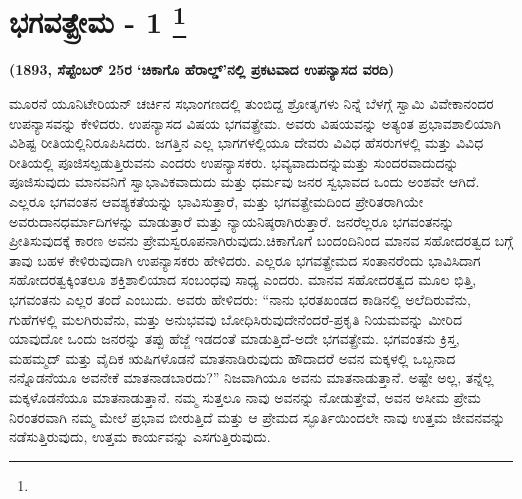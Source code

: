 
\vspace{-0.6cm}

\chapter[ಭಗವತ್ಪ್ರೇಮ - ೧ ]{ಭಗವತ್ಪ್ರೇಮ - 1 \protect\footnote{}}

\vskip 6pt

\vskip 6pt

\centerline{\textbf{(1893, ಸೆಪ್ಟೆಂಬರ್​ 25ರ ‘ಚಿಕಾಗೊ ಹೆರಾಲ್ಡ್​’ನಲ್ಲಿ ಪ್ರಕಟವಾದ ಉಪನ್ಯಾಸದ ವರದಿ)}}

\vskip 6pt

\vskip 6pt

ಮೂರನೆ ಯೂನಿಟೇರಿಯನ್​ ಚರ್ಚಿನ ಸಭಾಂಗಣದಲ್ಲಿ ತುಂಬಿದ್ದ ಶ್ರೋತೃಗಳು ನಿನ್ನೆ ಬೆಳಗ್ಗೆ ಸ್ವಾಮಿ ವಿವೇಕಾನಂದರ ಉಪನ್ಯಾಸವನ್ನು ಕೇಳಿದರು. ಉಪನ್ಯಾಸದ ವಿಷಯ ಭಗವತ್ಪ್ರೇಮ. ಅವರು ವಿಷಯವನ್ನು ಅತ್ಯಂತ ಪ್ರಭಾವಶಾಲಿಯಾಗಿ ವಿಶಿಷ್ಟ ರೀತಿಯಲ್ಲಿ\break ನಿರೂಪಿಸಿದರು. ಜಗತ್ತಿನ ಎಲ್ಲ ಭಾಗಗಳಲ್ಲಿಯೂ ದೇವರು ವಿವಿಧ ಹೆಸರುಗಳಲ್ಲಿ ಮತ್ತು ವಿವಿಧ ರೀತಿಯಲ್ಲಿ ಪೂಜಿಸಲ್ಪಡುತ್ತಿರುವನು ಎಂದರು ಉಪನ್ಯಾಸಕರು. ಭವ್ಯವಾದುದನ್ನು\break ಮತ್ತು ಸುಂದರವಾದುದನ್ನು ಪೂಜಿಸುವುದು ಮಾನವನಿಗೆ ಸ್ವಾಭಾವಿಕವಾದುದು ಮತ್ತು ಧರ್ಮವು ಜನರ ಸ್ವಭಾವದ ಒಂದು ಅಂಶವೇ ಆಗಿದೆ. ಎಲ್ಲರೂ ಭಗವಂತನ ಆವಶ್ಯ\-ಕತೆಯನ್ನು ಭಾವಿಸುತ್ತಾರೆ, ಮತ್ತು ಭಗವತ್ಪ್ರೇಮದಿಂದ ಪ್ರೇರಿತರಾಗಿಯೇ ಅವರು\break ದಾನಧರ್ಮಾದಿಗಳನ್ನು ಮಾಡುತ್ತಾರೆ ಮತ್ತು ನ್ಯಾಯನಿಷ್ಠರಾಗಿರುತ್ತಾರೆ. ಜನರೆಲ್ಲರೂ ಭಗವಂತನನ್ನು ಪ್ರೀತಿಸುವುದಕ್ಕೆ ಕಾರಣ ಅವನು ಪ್ರೇಮಸ್ವರೂಪನಾಗಿರುವುದು.\break ಚಿಕಾಗೊಗೆ ಬಂದಂದಿನಿಂದ ಮಾನವ ಸಹೋದರತ್ವದ ಬಗ್ಗೆ ತಾವು ಬಹಳ ಕೇಳಿರುವುದಾಗಿ ಉಪನ್ಯಾಸಕರು ಹೇಳಿದರು. ಎಲ್ಲರೂ ಭಗವತ್ಪ್ರೇಮದ ಸಂತಾನರೆಂದು ಭಾವಿಸಿದಾಗ ಸಹೋದರತ್ವಕ್ಕಿಂತಲೂ ಶಕ್ತಿಶಾಲಿಯಾದ ಸಂಬಂಧವು ಸಾಧ್ಯ ಎಂದರು. ಮಾನವ ಸಹೋದರತ್ವದ ಮೂಲ ಭಿತ್ತಿ, ಭಗವಂತನು ಎಲ್ಲರ ತಂದೆ ಎಂಬುದು. ಅವರು ಹೇಳಿದರು: “ನಾನು ಭರತಖಂಡದ ಕಾಡಿನಲ್ಲಿ ಅಲೆದಿರುವೆನು, ಗುಹೆಗಳಲ್ಲಿ ಮಲಗಿರುವೆನು, ಮತ್ತು ಅನುಭವವು ಬೋಧಿಸಿರುವುದೇನೆಂದರೆ-ಪ್ರಕೃತಿ ನಿಯಮವನ್ನು ಮೀರಿದ ಯಾವುದೋ ಒಂದು ಜನರನ್ನು ತಪ್ಪು ಹೆಜ್ಜೆ ಇಡದಂತೆ ಮಾಡುತ್ತಿದೆ-ಅದೇ ಭಗವತ್ಪ್ರೇಮ. ಭಗವಂತನು ಕ್ರಿಸ್ತ, ಮಹಮ್ಮದ್​ ಮತ್ತು ವೈದಿಕ ಋಷಿಗಳೊಡನೆ ಮಾತನಾಡಿರುವುದು ಹೌದಾದರೆ ಅವನ ಮಕ್ಕಳಲ್ಲಿ ಒಬ್ಬನಾದ ನನ್ನೊಡನೆಯೂ ಅವನೇಕೆ ಮಾತನಾಡಬಾರದು?” ನಿಜವಾಗಿಯೂ ಅವನು ಮಾತನಾಡುತ್ತಾನೆ. ಅಷ್ಟೇ ಅಲ್ಲ, ತನ್ನೆಲ್ಲ ಮಕ್ಕಳೊಡನೆಯೂ ಮಾತನಾಡುತ್ತಾನೆ. ನಮ್ಮ ಸುತ್ತಲೂ ನಾವು ಅವನನ್ನು ನೋಡುತ್ತೇವೆ, ಅವನ ಅಸೀಮ ಪ್ರೇಮ ನಿರಂತರವಾಗಿ ನಮ್ಮ ಮೇಲೆ ಪ್ರಭಾವ ಬೀರುತ್ತಿದೆ ಮತ್ತು ಆ ಪ್ರೇಮದ ಸ್ಫೂರ್ತಿಯಿಂದಲೇ ನಾವು ಉತ್ತಮ ಜೀವನವನ್ನು ನಡೆಸುತ್ತಿರುವುದು, ಉತ್ತಮ ಕಾರ್ಯವನ್ನು ಎಸಗುತ್ತಿರುವುದು.

